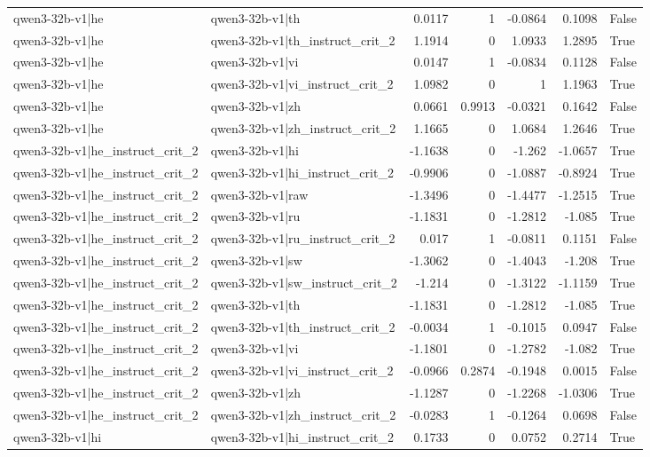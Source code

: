 \begin{table}
\begin{tabular}{l l r r r r l}
qwen3-32b-v1|he & qwen3-32b-v1|th & 0.0117 & 1 & -0.0864 & 0.1098 & False \\
qwen3-32b-v1|he & qwen3-32b-v1|th_instruct_crit_2 & 1.1914 & 0 & 1.0933 & 1.2895 & True \\
qwen3-32b-v1|he & qwen3-32b-v1|vi & 0.0147 & 1 & -0.0834 & 0.1128 & False \\
qwen3-32b-v1|he & qwen3-32b-v1|vi_instruct_crit_2 & 1.0982 & 0 & 1 & 1.1963 & True \\
qwen3-32b-v1|he & qwen3-32b-v1|zh & 0.0661 & 0.9913 & -0.0321 & 0.1642 & False \\
qwen3-32b-v1|he & qwen3-32b-v1|zh_instruct_crit_2 & 1.1665 & 0 & 1.0684 & 1.2646 & True \\
qwen3-32b-v1|he_instruct_crit_2 & qwen3-32b-v1|hi & -1.1638 & 0 & -1.262 & -1.0657 & True \\
qwen3-32b-v1|he_instruct_crit_2 & qwen3-32b-v1|hi_instruct_crit_2 & -0.9906 & 0 & -1.0887 & -0.8924 & True \\
qwen3-32b-v1|he_instruct_crit_2 & qwen3-32b-v1|raw & -1.3496 & 0 & -1.4477 & -1.2515 & True \\
qwen3-32b-v1|he_instruct_crit_2 & qwen3-32b-v1|ru & -1.1831 & 0 & -1.2812 & -1.085 & True \\
qwen3-32b-v1|he_instruct_crit_2 & qwen3-32b-v1|ru_instruct_crit_2 & 0.017 & 1 & -0.0811 & 0.1151 & False \\
qwen3-32b-v1|he_instruct_crit_2 & qwen3-32b-v1|sw & -1.3062 & 0 & -1.4043 & -1.208 & True \\
qwen3-32b-v1|he_instruct_crit_2 & qwen3-32b-v1|sw_instruct_crit_2 & -1.214 & 0 & -1.3122 & -1.1159 & True \\
qwen3-32b-v1|he_instruct_crit_2 & qwen3-32b-v1|th & -1.1831 & 0 & -1.2812 & -1.085 & True \\
qwen3-32b-v1|he_instruct_crit_2 & qwen3-32b-v1|th_instruct_crit_2 & -0.0034 & 1 & -0.1015 & 0.0947 & False \\
qwen3-32b-v1|he_instruct_crit_2 & qwen3-32b-v1|vi & -1.1801 & 0 & -1.2782 & -1.082 & True \\
qwen3-32b-v1|he_instruct_crit_2 & qwen3-32b-v1|vi_instruct_crit_2 & -0.0966 & 0.2874 & -0.1948 & 0.0015 & False \\
qwen3-32b-v1|he_instruct_crit_2 & qwen3-32b-v1|zh & -1.1287 & 0 & -1.2268 & -1.0306 & True \\
qwen3-32b-v1|he_instruct_crit_2 & qwen3-32b-v1|zh_instruct_crit_2 & -0.0283 & 1 & -0.1264 & 0.0698 & False \\
qwen3-32b-v1|hi & qwen3-32b-v1|hi_instruct_crit_2 & 0.1733 & 0 & 0.0752 & 0.2714 & True \\

\end{tabular}
\end{table}
